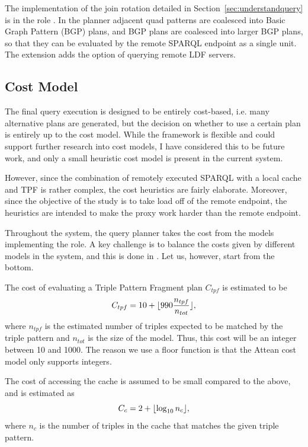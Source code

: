 The implementation of the join rotation detailed in
Section~\ref{sec:understandquery} is in the role
. In the planner
 adjacent quad patterns are
coalesced into Basic Graph Pattern (BGP) plans, and BGP plans are
coalesced into larger BGP plans, so that they can be evaluated by the
remote SPARQL endpoint as a single unit. The extension
 adds the option of
querying remote LDF servers.

\subsection{Cost Model}\label{sec:costheuristics}

The final query execution is designed to be entirely cost-based,
i.e. many alternative plans are generated, but the decision on whether
to use a certain plan is entirely up to the cost model. While the
framework is flexible and could support further research into cost
models, I have considered this to be future work, and only a small
heuristic cost model is present in the current system. 

However, since the combination of remotely executed SPARQL with a
local cache and TPF is rather complex, the cost
heuristics are fairly elaborate. Moreover, since the objective of the
study is to take load off of the remote endpoint, the heuristics are
intended to make the proxy work harder than the remote endpoint.

Throughout the system, the query planner takes the cost from the
models implementing the  role. A
key challenge is to balance the costs given by different models in the
system, and this is done in
. Let us, however, start
from the bottom. 

The cost of evaluating a Triple Pattern Fragment plan $C_{tpf}$ is estimated to
be 
\begin{equation}
C_{tpf} = 10 + \lfloor 990 \frac{n_{tpf}}{n_{tot}} \rfloor ,
\end{equation}
where $n_{tpf}$ is the estimated number of triples expected to be
matched by the triple pattern and $n_{tot}$ is the size of the
model. Thus, this cost will be an integer between 10 and 1000. The
reason we use a floor function is that the Attean cost model only
supports integers.

The cost of accessing the cache is assumed to be small compared to the
above, and is estimated as 
\begin{equation}
C_c = 2 + \lfloor \log_{10}{n_c} \rfloor , 
\end{equation}
where $n_c$ is the number of triples in the cache that matches the
given triple pattern.

